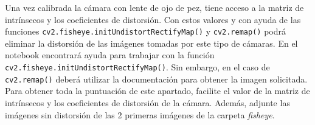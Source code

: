 \vspace{5mm}
\begin{tcolorbox}[colback=gray!10, colframe=gray!30, coltitle=black, title=Pregunta B.1, halign=left]
Una vez calibrada la cámara con lente de ojo de pez, tiene acceso a la matriz de intrínsecos y los coeficientes de distorsión. Con estos valores y con ayuda de las funciones \texttt{cv2.fisheye.initUndistortRectifyMap()} y \texttt{cv2.remap()} podrá eliminar la distorsión de las imágenes tomadas por este tipo de cámaras. En el notebook encontrará ayuda para trabajar con la función \texttt{cv2.fisheye.initUndistortRectifyMap()}. Sin embargo, en el caso de \texttt{cv2.remap()} \footnotemark deberá utilizar la documentación para obtener la imagen solicitada. Para obtener toda la puntuación de este apartado, facilite el valor de la matriz de intrínsecos y los coeficientes de distorsión de la cámara. Además, adjunte las imágenes sin distorsión de las 2 primeras imágenes de la carpeta \textit{fisheye}.
\end{tcolorbox}



